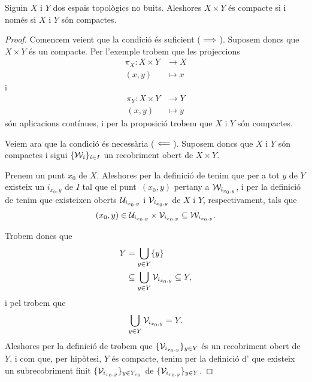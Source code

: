 \documentclass[../../Main.tex]{subfiles}
\begin{document}
	\begin{theorem}
		\label{thm:Teorema de Tychonoff}
		Siguin \(X\) i \(Y\) dos espais topològics no buits. Aleshores \(X\times Y\) és compacte si i només si \(X\) i \(Y\) són compactes.
		\begin{proof}
			Comencem veient que la condició és suficient (\(\implies\)). Suposem doncs que \(X\times Y\) és un compacte. Per l'exemple  trobem que les projeccions
			\begin{align*}
				\pi_{X}\colon X\times Y&\longrightarrow X \\
				(x,y)&\longmapsto x
			\end{align*}
			i
			\begin{align*}
				\pi_{Y}\colon X\times Y&\longrightarrow Y \\
				(x,y)&\longmapsto y
			\end{align*}
			són aplicacions contínues, i per la proposició  trobem que \(X\) i \(Y\) són compactes.
			
			Veiem ara que la condició és necessària (\(\impliedby\)). Suposem doncs que \(X\) i \(Y\) són compactes i sigui \(\{\mathcal{W}_{i}\}_{i\in I}\) un recobriment obert de \(X\times Y\).
			
			Prenem un punt \(x_{0}\) de \(X\). Aleshores per la definició de  tenim que per a tot \(y\) de \(Y\) existeix un \(i_{x_{0},y}\) de \(I\) tal que el punt~\((x_{0},y)\) pertany a \(\mathcal{W}_{i_{x_{0},y}}\), i per la definició de  tenim que existeixen oberts \(\mathcal{U}_{i_{x_{0},y}}\) i \(\mathcal{V}_{i_{x_{0},y}}\) de \(X\) i \(Y\), respectivament, tals que
			\[
			    (x_{0},y)\in\mathcal{U}_{i_{x_{0},y}}\times\mathcal{V}_{i_{x_{0},y}}\subseteq\mathcal{W}_{i_{x_{0},y}}.
			\]
			
			Trobem doncs que
			\begin{align*}
				Y&=\bigcup_{y\in Y}\{y\} \\
				&\subseteq\bigcup_{y\in Y}\mathcal{V}_{i_{x_{0},y}}\subseteq Y,
			\end{align*}
			i pel  trobem que
			\[
			    \bigcup_{y\in Y}\mathcal{V}_{i_{x_{0},y}}=Y.
			\]
			Aleshores per la definició de  trobem que \(\{\mathcal{V}_{i_{x_{0},y}}\}_{y\in Y}\) és un recobriment obert de \(Y\), i com que, per hipòtesi, \(Y\) és compacte, tenim per la definició d' que existeix un subrecobriment finit \(\{\mathcal{V}_{i_{x_{0},y}}\}_{y\in Y_{x_{0}}}\) de \(\{\mathcal{V}_{i_{x_{0},y}}\}_{y\in Y}\).
			

\end{proof}
\end{theorem}
\end{document}
